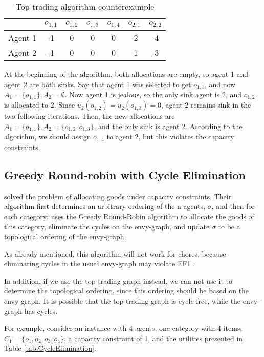 \documentclass[sigconf]{aamas}
\theoremstyle{definition}
\begin{document}
\begin{table}[]
    \caption{Top trading algorithm counterexample}
    \label{tab:top-trading}
    \centering
    \begin{tabular}{||c | c c c c | c c||} 
    \hline
    {} & {$o_{1,1}$} & {$o_{1,2}$} & {$o_{1,3}$} & {$o_{1,4}$} & {$o_{2,1}$} & {$o_{2,2}$} \\ [0.5ex] 
    \hline\hline
    Agent 1 & -1 & 0 & 0 & 0 & -2 & -4 \\
    \hline
    Agent 2 & -1 & 0 & 0 & 0 & -1 & -3 \\
    \hline
    \end{tabular} 
\end{table}
At the beginning of the algorithm, both allocations are empty, so agent 1 and agent 2 are both sinks. 
Say that agent 1 was selected to get $o_{1,1}$, and now $A_1=\{o_{1,1}\}, A_2=\emptyset$.
Now agent 1 is jealous, so the only sink agent is 2, and $o_{1,2}$ is allocated to 2.
Since $u_2(o_{1,2})=u_2(o_{1,3})=0$, agent 2 remains sink in the two following iterations. Then, the new allocations are $A_1=\{o_{1,1}\}, A_2=\{o_{1,2},o_{1,3}\}$, and the only sink is agent 2. 
According to the algorithm, we should assign $o_{1,4}$ to agent 2, but this violates the capacity constraints. 

\subsection{Greedy Round-robin with Cycle Elimination}

\citet{biswas2018} solved the problem of allocating goods under capacity constraints. 
Their algorithm first determines an arbitrary ordering of the n agents, $\sigma$, and then for each category: uses the Greedy Round-Robin algorithm to allocate the goods of this category, eliminate the cycles on the envy-graph, and update $\sigma$ to be a topological ordering of the envy-graph. 

As already mentioned, this algorithm will not work for chores, because eliminating cycles in the usual envy-graph may violate EF1 \cite{vaish2020}.

In addition, if we use the top-trading graph instead, 
we can not use it to determine the topological ordering, since this ordering should be based on the envy-graph.
It is possible that the top-trading graph is cycle-free, while the envy-graph has cycles.

For example, consider an instance with 4 agents, one category with 4 items, $C_1=\{o_1,o_2,o_3,o_4\}$, a capacity constraint of 1, and the utilities presented in Table \ref{tab:CycleElimination}. 
\end{document}

